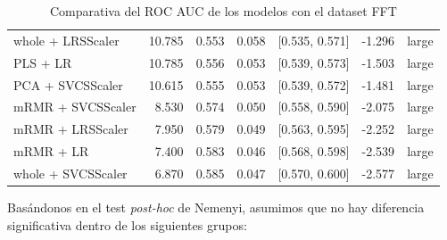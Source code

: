 \documentclass[a4paper,oneside,11pt,leqno]{article}
\begin{document}
\begin{table}[h]
\begin{tabular}{lrrrlll}
			whole + LRSScaler  & 10.785 & 0.553 & 0.058 &  [0.535, 0.571] & -1.296 &       large \\
			PLS + LR           & 10.785 & 0.556 & 0.053 &  [0.539, 0.573] & -1.503 &       large \\
			PCA + SVCSScaler   & 10.615 & 0.555 & 0.053 &  [0.539, 0.572] & -1.481 &       large \\
			mRMR + SVCSScaler  &  8.530 & 0.574 & 0.050 &  [0.558, 0.590] & -2.075 &       large \\
			mRMR + LRSScaler   &  7.950 & 0.579 & 0.049 &  [0.563, 0.595] & -2.252 &       large \\
			mRMR + LR          &  7.400 & 0.583 & 0.046 &  [0.568, 0.598] & -2.539 &       large \\
			whole + SVCSScaler &  6.870 & 0.585 & 0.047 &  [0.570, 0.600] & -2.577 &       large \\
			\bottomrule
		\end{tabular}
		\caption{Comparativa del ROC AUC de los modelos con el dataset FFT}
		\label{tab:stat_results_fft}
	\end{table}
	
	Basándonos en el test \textit{post-hoc} de Nemenyi, asumimos que no hay diferencia significativa dentro de los siguientes grupos:
	
\end{document}
